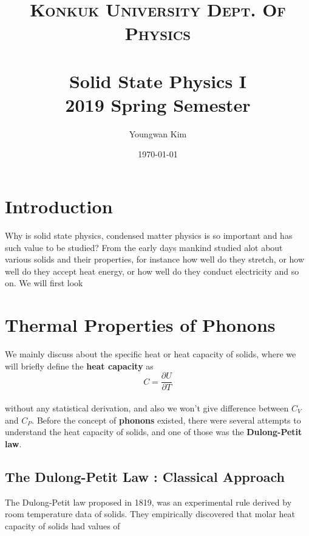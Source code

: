 \documentclass[paper=a4, fontsize=11pt]{scrartcl}
\title{	
	\normalfont \normalsize 
	\textsc{Konkuk University Dept. Of Physics} \\ [25pt] %
	\horrule{1pt} \\[0.4cm] 
	\huge Solid State Physics I \\
	\vspace{0.1in}
	\Large 2019 Spring Semester
	\horrule{1pt} \\[0.4cm] 
}
\author{Youngwan Kim}
\date{\normalsize\today}
\newcommand{\pder}[2]{\frac{\partial #1}{\partial #2}}
\begin{document}
	
\maketitle	

\vspace{0.25in}
\section{Introduction}
\vspace{0.25in}

Why is solid state physics, condensed matter physics is so important and has such value to be studied? From the early days mankind studied alot about various solids and their properties, for instance how well do they stretch, or how well do they accept heat energy, or how well do they conduct electricity and so on. We will first look 

\vspace{0.25in}
\section{Thermal Properties of Phonons}
\vspace{0.25in}

We mainly discuss about the specific heat or heat capacity of solids, where we will briefly define the \textbf{heat capacity} as \\

\begin{equation}\nonumber
	C = \pder{U}{T}
\end{equation}\\

without any statistical derivation, and also we won't give difference between $C_V$ and $C_P$. Before the concept of \textbf{phonons} existed, there were several attempts to understand the heat capacity of solids, and one of those was the \textbf{Dulong-Petit law}.

\vspace{0.15in}
\subsection{The Dulong-Petit Law : Classical Approach}
\vspace{0.15in}

The Dulong-Petit law proposed in 1819, was an experimental rule derived by room temperature data of solids. They empirically discovered that molar heat capacity of solids had values of \\
\end{document}
